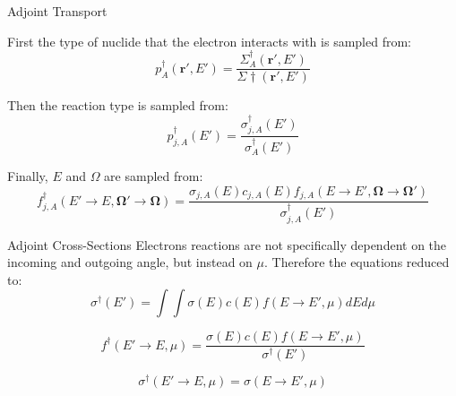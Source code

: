 \documentclass{beamer}
\begin{document}
\begin{frame}{Adjoint Transport}

First the type of nuclide that the electron interacts with is sampled from:
\begin{equation}
p^{\dagger}_A(\boldsymbol{r'},E') = \frac{\Sigma^{\dagger}_A(\boldsymbol{r'},E')}{\Sigma{\dagger}(\boldsymbol{r'},E')}
\end{equation}

Then the reaction type is sampled from:
\begin{equation}
p^{\dagger}_{j,A}(E') = \frac{\sigma^{\dagger}_{j,A}(E')}{\sigma^{\dagger}_A(E')} \nonumber
\end{equation}

Finally, $E$ and $\Omega$ are sampled from:
\begin{equation}
f^{\dagger}_{j,A}(E'\rightarrow E,\boldsymbol{\Omega'}\rightarrow\boldsymbol{\Omega}) = 
\frac{\sigma_{j,A}(E)c_{j,A}(E)f_{j,A}(E\rightarrow E',\boldsymbol{\Omega}\rightarrow\boldsymbol{\Omega'})}{\sigma^{\dagger}_{j,A}(E')} \nonumber
\end{equation}

\end{frame}


\begin{frame}{Adjoint Cross-Sections}
Electrons reactions are not specifically dependent on the incoming and outgoing angle, 
but instead on $\mu$. Therefore the equations reduced to:
\begin{equation}
\sigma^{\dagger}(E') = \int\int\sigma(E)c(E)f(E \rightarrow E', \mu)dEd\mu
\end{equation}

\begin{equation}
f^{\dagger}(E' \rightarrow E, \mu) = \frac{\sigma(E)c(E)f(E \rightarrow E', \mu)}{\sigma^{\dagger}(E')}
\end{equation}

\begin{equation}
\sigma^{\dagger}(E' \rightarrow E, \mu) = \sigma(E \rightarrow E', \mu)
\end{equation}

\end{frame}
\end{document}

